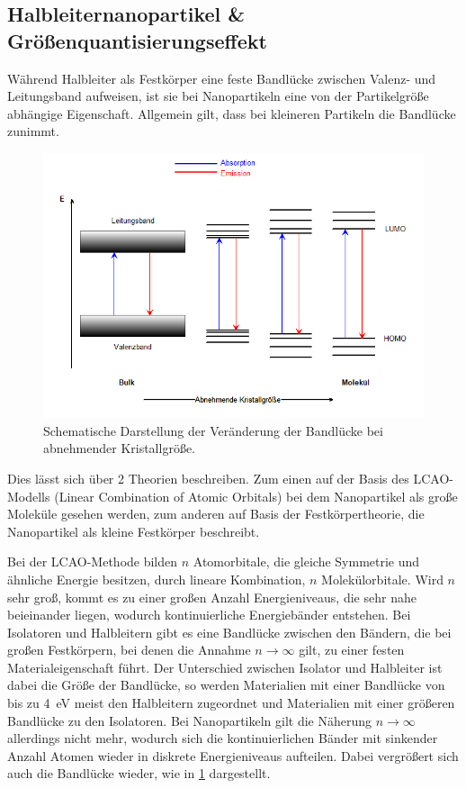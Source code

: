 	\subsection{Halbleiternanopartikel \& Größenquantisierungseffekt}
	Während Halbleiter als Festkörper eine feste Bandlücke zwischen Valenz- und Leitungsband aufweisen, ist sie bei Nanopartikeln eine von der Partikelgröße abhängige Eigenschaft.
	Allgemein gilt, dass bei kleineren Partikeln die Bandlücke zunimmt.
	\begin{figure}[h]
		\centering
		\includegraphics[width=0.6\linewidth]{Bilder/Quantumsizeeffect}
		\caption{Schematische Darstellung der Veränderung der Bandlücke bei abnehmender Kristallgröße.}
		\label{fig:LCAO}
	\end{figure}
	
    Dies lässt sich über 2 Theorien beschreiben. Zum einen auf der Basis des LCAO-Modells (Linear Combination of Atomic Orbitals) bei dem Nanopartikel als große Moleküle gesehen werden, zum anderen auf Basis der Festkörpertheorie, die Nanopartikel als kleine Festkörper beschreibt.
	
	Bei der LCAO-Methode bilden $n$ Atomorbitale, die gleiche Symmetrie und ähnliche Energie besitzen, durch lineare Kombination, $n$ Molekülorbitale. Wird $n$ sehr groß, kommt es zu einer großen Anzahl Energieniveaus, die sehr nahe beieinander liegen, wodurch kontinuierliche Energiebänder entstehen.
	Bei Isolatoren und Halbleitern gibt es eine Bandlücke zwischen den Bändern, die bei großen Festkörpern, bei denen die Annahme $n \rightarrow \infty$  gilt, zu einer festen Materialeigenschaft führt.
	Der Unterschied zwischen Isolator und Halbleiter ist dabei die Größe der Bandlücke, so werden Materialien mit einer Bandlücke von bis zu 4~eV meist den Halbleitern zugeordnet und Materialien mit einer größeren Bandlücke zu den Isolatoren.
	Bei Nanopartikeln gilt die Näherung $n \rightarrow \infty$ allerdings nicht mehr, wodurch sich die kontinuierlichen Bänder mit sinkender Anzahl Atomen wieder in diskrete Energieniveaus aufteilen. Dabei vergrößert sich auch die Bandlücke wieder, wie in \cref{fig:LCAO} dargestellt.
	
